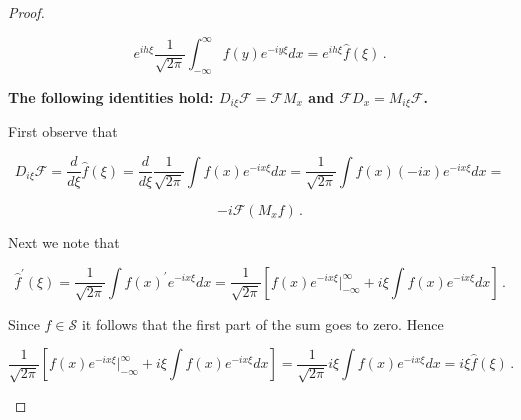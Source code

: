 \documentclass[a4paper]{article}
\numberwithin{equation}{section}
\begin{document}
\begin{description}
\begin{proof}
\begin{description}
$$e^{ih\xi}\frac{1}{\sqrt{2\pi}}\int_{-\infty}^\infty f(y)e^{-iy\xi}dx = e^{ih\xi}\hat{f}(\xi)\,.$$

\item \textbf{The following identities hold: $D_{i\xi}\mathcal{F} = \mathcal{F}M_{x}$ and $\mathcal{F}D_x = M_{i\xi}\mathcal{F}$.}

First observe that 

$$D_{i\xi}\mathcal{F} = \frac{d}{d\xi}\hat{f}(\xi) = \frac{d}{d\xi}\frac{1}{\sqrt{2\pi}}\int f(x)e^{-ix\xi}dx = \frac{1}{\sqrt{2\pi}}\int f(x)(-ix)e^{-ix\xi}dx = $$

$$-i\mathcal{F}(M_xf)\,.$$

Next we note that

$$\hat{f}^\prime(\xi) = \frac{1}{\sqrt{2\pi}}\int f(x)^\prime e^{-ix\xi}dx = \frac{1}{\sqrt{2\pi}}\left[f(x)e^{-ix\xi}\Big|_{-\infty}^\infty + i\xi \int f(x) e^{-ix\xi}dx\right]\,.$$ 

Since $f \in \mathcal{S}$ it follows that the first part of the sum goes to zero. Hence

$$\frac{1}{\sqrt{2\pi}}\left[f(x)e^{-ix\xi}\Big|_{-\infty}^\infty + i\xi \int f(x) e^{-ix\xi}dx\right] = \frac{1}{\sqrt{2\pi}}i\xi \int f(x) e^{-ix\xi}dx = i\xi\hat{f}(\xi)\,.$$
	
	\end{description}

\end{proof}

\end{description}
\end{document}
